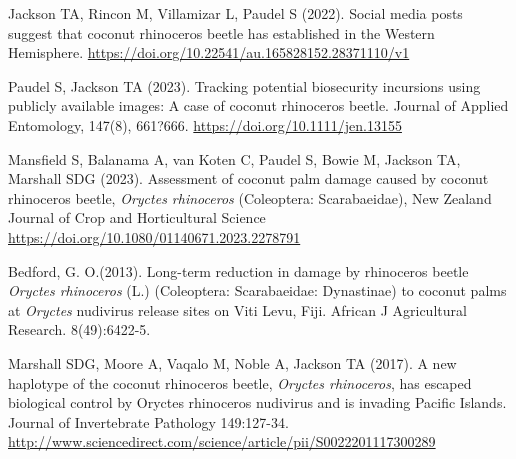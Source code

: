 \documentclass[11pt,english,letterpaper]{scrartcl}
\begin{document}
\begingroup
\renewcommand{\section}[2]{}%
\begin{thebibliography}{1}
	
 Jackson TA, Rincon M, Villamizar L, Paudel S (2022). Social media posts suggest that coconut rhinoceros beetle has established in the Western Hemisphere. \url{https://doi.org/10.22541/au.165828152.28371110/v1}
	
 Paudel S, Jackson TA (2023). Tracking potential biosecurity incursions using publicly available images: A case of coconut rhinoceros beetle. Journal of Applied Entomology, 147(8), 661?666. 
\url{https://doi.org/10.1111/jen.13155}
	
 Mansfield S, Balanama A, van Koten C, Paudel S, Bowie M, Jackson TA, Marshall SDG (2023). Assessment of coconut palm damage caused by coconut rhinoceros beetle, \textit{Oryctes rhinoceros} (Coleoptera: Scarabaeidae), New Zealand Journal of Crop and Horticultural Science \url{https://doi.org/10.1080/01140671.2023.2278791}
	

 Bedford, G. O.(2013). Long-term reduction in damage by rhinoceros beetle \textit{Oryctes rhinoceros} (L.) (Coleoptera: Scarabaeidae: Dynastinae) to coconut palms at \textit{Oryctes} nudivirus release sites on Viti Levu, Fiji. African J Agricultural Research. 8(49):6422-5. 

 Marshall SDG, Moore A, Vaqalo M, Noble A, Jackson TA (2017). A new haplotype of the coconut rhinoceros beetle, \textit{Oryctes rhinoceros}, has escaped biological control by Oryctes rhinoceros nudivirus and is invading Pacific Islands. Journal of Invertebrate Pathology 149:127-34. 
\url{ http://www.sciencedirect.com/science/article/pii/S0022201117300289}




\end{thebibliography}
\end{document}
